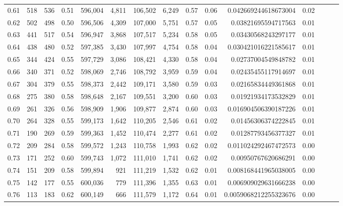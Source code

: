 \begin{tabular}{rrrrrrrrrrrrrrr}
0.61 &     518 &    536 &  0.51 &  596,004 &    4,811 &  106,502 &    6,249 &  0.57 &  0.06 &    0.042669244618673004 &      0.02 \\
0.62 &     502 &    498 &  0.50 &  596,506 &    4,309 &  107,000 &    5,751 &  0.57 &  0.05 &     0.03821695594717563 &      0.01 \\
0.63 &     441 &    517 &  0.54 &  596,947 &    3,868 &  107,517 &    5,234 &  0.58 &  0.05 &     0.03430568243297177 &      0.01 \\
0.64 &     438 &    480 &  0.52 &  597,385 &    3,430 &  107,997 &    4,754 &  0.58 &  0.04 &    0.030421016221585617 &      0.01 \\
0.65 &     344 &    424 &  0.55 &  597,729 &    3,086 &  108,421 &    4,330 &  0.58 &  0.04 &     0.02737004549848782 &      0.01 \\
0.66 &     340 &    371 &  0.52 &  598,069 &    2,746 &  108,792 &    3,959 &  0.59 &  0.04 &     0.02435455117914697 &      0.01 \\
0.67 &     304 &    379 &  0.55 &  598,373 &    2,442 &  109,171 &    3,580 &  0.59 &  0.03 &     0.02165834449361868 &      0.01 \\
0.68 &     275 &    380 &  0.58 &  598,648 &    2,167 &  109,551 &    3,200 &  0.60 &  0.03 &     0.01921934173532829 &      0.01 \\
0.69 &     261 &    326 &  0.56 &  598,909 &    1,906 &  109,877 &    2,874 &  0.60 &  0.03 &    0.016904506390187226 &      0.01 \\
0.70 &     264 &    328 &  0.55 &  599,173 &    1,642 &  110,205 &    2,546 &  0.61 &  0.02 &     0.01456306374222845 &      0.01 \\
0.71 &     190 &    269 &  0.59 &  599,363 &    1,452 &  110,474 &    2,277 &  0.61 &  0.02 &     0.01287793456377327 &      0.01 \\
0.72 &     209 &    284 &  0.58 &  599,572 &    1,243 &  110,758 &    1,993 &  0.62 &  0.02 &    0.011024292467472573 &      0.00 \\
0.73 &     171 &    252 &  0.60 &  599,743 &    1,072 &  111,010 &    1,741 &  0.62 &  0.02 &     0.00950767620686291 &      0.00 \\
0.74 &     151 &    209 &  0.58 &  599,894 &      921 &  111,219 &    1,532 &  0.62 &  0.01 &    0.008168441965038005 &      0.00 \\
0.75 &     142 &    177 &  0.55 &  600,036 &      779 &  111,396 &    1,355 &  0.63 &  0.01 &    0.006909029631666238 &      0.00 \\
0.76 &     113 &    183 &  0.62 &  600,149 &      666 &  111,579 &    1,172 &  0.64 &  0.01 &   0.0059068212255323676 &      0.00 \\

\end{tabular}
